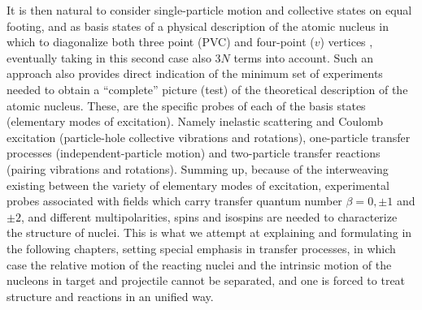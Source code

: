 It is then natural to consider single-particle motion  and collective states on equal footing, and as basis states of a physical description of the atomic nucleus in which to diagonalize both three point  (PVC) and four-point ($v$) vertices , eventually taking in this second case also 3$N$ terms into account. Such an approach also provides direct indication of the minimum set of experiments needed to obtain a ``complete'' picture (test)  of the theoretical description of the atomic nucleus. These, are the specific probes of each of the basis states (elementary modes of excitation). Namely inelastic scattering and Coulomb excitation (particle-hole collective vibrations and rotations), one-particle transfer processes (independent-particle motion) and two-particle transfer reactions (pairing vibrations and rotations). Summing up, because of the interweaving existing between the variety of elementary modes of excitation, experimental probes associated with fields which carry transfer quantum number $\beta=0, \pm 1$ and $\pm2$, and different multipolarities, spins and isospins are needed to characterize the structure of nuclei. This is what we attempt at explaining and formulating in the following chapters, setting special emphasis in transfer processes, in which case the relative motion of the reacting nuclei and the intrinsic motion of the nucleons in target and projectile cannot be separated, and one is forced to treat structure and reactions in an unified way.









%

%
